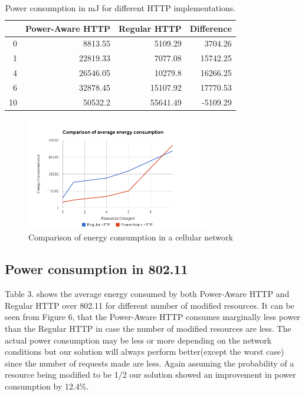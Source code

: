 \documentclass{sigplanconf}
\begin{document}
\begin{table}[htbp]
\centering
\caption{Power consumption in mJ for different HTTP implementations.}
\begin{tabular}{|r|r|r|r|}
\hline
\multicolumn{1}{|l|}{} & \multicolumn{1}{l|}{Power-Aware HTTP} & \multicolumn{1}{l|}{Regular HTTP} & \multicolumn{1}{l|}{Difference} \\ \hline
0 & 8813.55 & 5109.29 & 3704.26 \\ \hline
1 & 22819.33 & 7077.08 & 15742.25 \\ \hline
4 & 26546.05 & 10279.8 & 16266.25 \\ \hline
6 & 32878.45 & 15107.92 & 17770.53 \\ \hline
10 & 50532.2 & 55641.49 & -5109.29 \\ \hline
\end{tabular}
\label{}
\end{table}



\begin{figure}[ht!]
\centering
\includegraphics[width=80mm]{avg_energy_cell.png}
\caption{Comparison of energy consumption in a cellular network}
\label{fig:sp_gd_mnist}
\end{figure}

\subsection{Power consumption in 802.11}
Table 3. shows the average energy consumed by both Power-Aware HTTP and Regular HTTP over 802.11 for different number of modified resources. It can be seen from Figure 6, that the Power-Aware HTTP consumes marginally less power than the Regular HTTP in case the number of modified resources are less. The actual power consumption may be less or more depending on the network conditions but our solution will always perform better(except the worst case) since the number of requests made are less. Again assuming the probability of a resource being modified to be 1/2 our solution showed an improvement in power consumption by 12.4\%.
\end{document}

